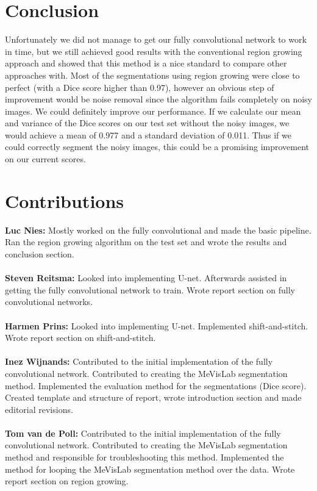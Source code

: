 \documentclass[a4paper,10pt]{article}
\numberwithin{equation}{section} %
\numberwithin{figure}{section} %
\numberwithin{table}{section} %
\begin{document}
\section{Conclusion}
Unfortunately we did not manage to get our fully convolutional network to work in time, but we still achieved good results with the conventional region growing approach and showed that this method is a nice standard to compare other approaches with. Most of the segmentations using region growing were close to perfect (with a Dice score higher than 0.97), however an obvious step of improvement would be noise removal since the algorithm fails completely on noisy images. We could definitely improve our performance. If we calculate our mean and variance of the Dice scores on our test set without the noisy images, we would achieve a mean of 0.977 and a standard deviation of 0.011. Thus if we could correctly segment the noisy images, this could be a promising improvement on our current scores.

\clearpage

\appendix
\section{Contributions}

\textbf{Luc Nies:} Mostly worked on the fully convolutional and made the basic pipeline. Ran the region growing algorithm on the test set and wrote the results and conclusion section.\\
\\
\textbf{Steven Reitsma:} Looked into implementing U-net. Afterwards assisted in getting the fully convolutional network to train. Wrote report section on fully convolutional networks.\\
\\
\textbf{Harmen Prins:} Looked into implementing U-net. Implemented shift-and-stitch. Wrote report section on shift-and-stitch.\\
\\
\textbf{Inez Wijnands:} Contributed to the initial implementation of the fully convolutional network. Contributed to creating the MeVisLab segmentation method. Implemented the evaluation method for the segmentations (Dice score). Created template and structure of report, wrote introduction section and made editorial revisions.\\
\\
\textbf{Tom van de Poll:} Contributed to the initial implementation of the fully convolutional network. Contributed to creating the MeVisLab segmentation method and responsible for troubleshooting this method. Implemented the method for looping the MeVisLab segmentation method over the data. Wrote report section on region growing.
\end{document}
